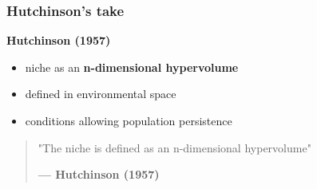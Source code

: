 \documentclass{beamer}
\begin{document}
\begin{frame}
  \frametitle{Hutchinson's take}

  \vspace{0.2cm}

  \textbf{Hutchinson (1957)} \nocite{hutchinson1957}
  \begin{itemize}
    \item niche as an \textbf{n-dimensional hypervolume}
    \item defined in environmental space
    \item conditions allowing population persistence
  \end{itemize}

  \vspace{1cm}

  \begin{quote}
    \scriptsize
    \raggedleft
    "The niche is defined as an n-dimensional hypervolume"

    \textbf{--- Hutchinson (1957)}
  \end{quote}

\end{frame}
\end{document}
